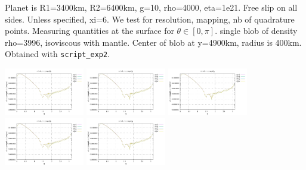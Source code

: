 Planet is R1=3400km, R2=6400km, g=10, rho=4000, eta=1e21.
Free slip on all sides. Unless specified, xi=6.
We test for resolution, mapping, nb of quadrature points.
Measuring quantities at the surface for $\theta\in[0,\pi]$.
single blob of density rho=3996, isoviscous with mantle.
Center of blob at y=4900km, radius is 400km.
Obtained with {\tt script\_exp2}.

\noindent
\includegraphics[width=3.5cm]{python_codes/fieldstone_152/RESULTS/exp2/vel_16_m2}
\includegraphics[width=3.5cm]{python_codes/fieldstone_152/RESULTS/exp2/vel_16_m3}
\includegraphics[width=3.5cm]{python_codes/fieldstone_152/RESULTS/exp2/vel_16_m4}
\includegraphics[width=3.5cm]{python_codes/fieldstone_152/RESULTS/exp2/vel_16_m5}
\includegraphics[width=3.5cm]{python_codes/fieldstone_152/RESULTS/exp2/vel_16_m6}

